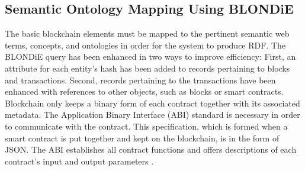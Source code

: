 \subsection{Semantic Ontology Mapping Using BLONDiE}
The basic blockchain elements must be mapped to the pertinent semantic web terms, concepts, and ontologies in order for the system to produce RDF. The BLONDiE query has been enhanced in two ways to improve efficiency: First, an attribute for each entity's hash has been added to records pertaining to blocks and transactions. Second, records pertaining to the transactions have been enhanced with references to other objects, such as blocks or smart contracts. \\
Blockchain only keeps a binary form of each contract together with its associated metadata. The Application Binary Interface (ABI) standard is necessary in order to communicate with the contract. This specification, which is formed when a smart contract is put together and kept on the blockchain, is in the form of JSON. The ABI establishes all contract functions and offers descriptions of each contract's input and output parameters \cite{Third}.
